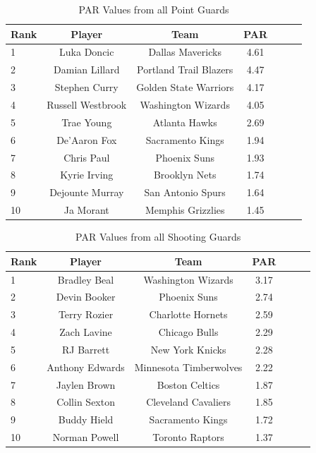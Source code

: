 \documentclass[12pt]{article}
\begin{document}
\begin{table}[H]
  \caption{PAR Values from all Point Guards}
  \label{tab:PGtable}
\centering
\begin{tabular}[t]{lcccccc}
  \toprule
  Rank & Player & Team & PAR\\
  \midrule
 1 & Luka Doncic & Dallas Mavericks & 4.61\\
 2 & Damian Lillard & Portland Trail Blazers & 4.47\\
 3 & Stephen Curry & Golden State Warriors & 4.17\\
 4 & Russell Westbrook & Washington Wizards & 4.05\\
 5 & Trae Young & Atlanta Hawks & 2.69\\
 6 & De'Aaron Fox & Sacramento Kings & 1.94\\
 7 & Chris Paul & Phoenix Suns & 1.93\\
 8 & Kyrie Irving & Brooklyn Nets & 1.74\\
 9 & Dejounte Murray & San Antonio Spurs & 1.64\\
 10 & Ja Morant & Memphis Grizzlies & 1.45\\
  \bottomrule
\end{tabular}
\end{table}

\begin{table}[H]
  \caption{PAR Values from all Shooting Guards}
  \label{tab:SGtable}
\centering
\begin{tabular}[t]{lcccccc}
  \toprule
  Rank & Player & Team & PAR\\
  \midrule
 1 & Bradley Beal & Washington Wizards & 3.17\\
 2 & Devin Booker & Phoenix Suns & 2.74\\
 3 & Terry Rozier & Charlotte Hornets & 2.59\\
 4 & Zach Lavine & Chicago Bulls & 2.29\\
 5 & RJ Barrett & New York Knicks & 2.28\\
 6 & Anthony Edwards & Minnesota Timberwolves & 2.22\\
 7 & Jaylen Brown & Boston Celtics & 1.87\\
 8 & Collin Sexton & Cleveland Cavaliers & 1.85\\
 9 & Buddy Hield & Sacramento Kings & 1.72\\
 10 & Norman Powell & Toronto Raptors & 1.37\\
  \bottomrule
\end{tabular}
\end{table}
\end{document}
